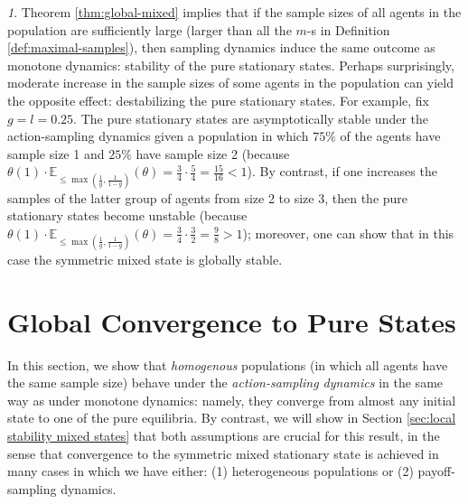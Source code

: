 \documentclass[12pt]{article}
\numberwithin{equation}{section}
\numberwithin{figure}{section}
\theoremstyle{definition}
\theoremstyle{plain}
\theoremstyle{plain}
\theoremstyle{plain}
\theoremstyle{remark}
\newtheorem{rem}{\protect\remarkname}
\theoremstyle{plain}
\theoremstyle{plain}
\providecommand{\remarkname}{Remark}
\begin{document}
\begin{rem}
Theorem \ref{thm:global-mixed} implies that if the sample sizes of all agents in the population are sufficiently large (larger than all the $m$-s in Definition \ref{def:maximal-samples}), then sampling dynamics induce the same outcome as monotone dynamics: stability of the pure stationary states.
Perhaps surprisingly, moderate increase in the sample sizes of some agents in the population can yield the opposite effect: destabilizing the pure stationary states. For example, fix $g=l=0.25.$ The pure stationary states are asymptotically stable under the action-sampling dynamics given a population in which $75\%$ of the agents have sample size 1 and $25\%$ have sample size 2 (because $\theta(1)\cdot\mathbb{E}_{\leq \max\left(\frac{1}{g},\frac{1}{1-g}\right)}\left(\theta\right)=\frac{3}{4}\cdot\frac{5}{4}=\frac{15}{16}<1$). By contrast, if one increases the samples of the latter group of agents from size 2 to size 3, then the pure stationary states become unstable (because $\theta(1)\cdot\mathbb{E}_{\leq \max\left(\frac{1}{g},\frac{1}{1-g}\right)}\left(\theta\right)=\frac{3}{4}\cdot\frac{3}{2}=\frac{9}{8}>1$); moreover, one can show that in this case the symmetric mixed state is globally stable.
\end{rem}
\section{Global Convergence to Pure States}\label{sec-conv-to-pure}
In this section, we show that \emph{homogenous} populations (in which all agents have the same sample size) behave under the \emph{action-sampling dynamics} in the same way as under monotone dynamics: namely, they converge from almost any initial state to one of the pure equilibria. By contrast, we will show in Section \ref{sec:local stability mixed states} that both assumptions are crucial for this result, in the sense that convergence  to the symmetric mixed stationary state is achieved in many cases in which we have either: (1)  heterogeneous  populations or (2) payoff-sampling dynamics.
\end{document}
